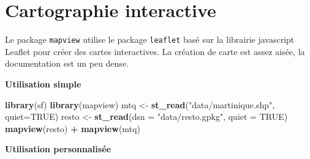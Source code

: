 \documentclass[]{book}
\newenvironment{Shaded}{\begin{snugshade}}{\end{snugshade}}
\newcommand{\KeywordTok}[1]{\textcolor[rgb]{0.13,0.29,0.53}{\textbf{#1}}}
\newcommand{\DataTypeTok}[1]{\textcolor[rgb]{0.13,0.29,0.53}{#1}}
\newcommand{\StringTok}[1]{\textcolor[rgb]{0.31,0.60,0.02}{#1}}
\newcommand{\OtherTok}[1]{\textcolor[rgb]{0.56,0.35,0.01}{#1}}
\newcommand{\OperatorTok}[1]{\textcolor[rgb]{0.81,0.36,0.00}{\textbf{#1}}}
\newcommand{\NormalTok}[1]{#1}
\begin{document}
\section{Cartographie interactive}\label{cartographie-interactive}

Le package \texttt{mapview} \citep{R-mapview} utilise le package
\texttt{leaflet} \citep{R-leaflet} basé sur la librairie javascript
Leaflet \citep{JS-Leaflet} pour créer des cartes interactives. La
création de carte est assez aisée, la documentation est un peu dense.

\textbf{Utilisation simple}

\begin{Shaded}
\begin{Highlighting}[]
\KeywordTok{library}\NormalTok{(sf)}
\KeywordTok{library}\NormalTok{(mapview)}
\NormalTok{mtq <-}\StringTok{ }\KeywordTok{st_read}\NormalTok{(}\StringTok{"data/martinique.shp"}\NormalTok{, }\DataTypeTok{quiet=}\OtherTok{TRUE}\NormalTok{)}
\NormalTok{resto <-}\StringTok{ }\KeywordTok{st_read}\NormalTok{(}\DataTypeTok{dsn =} \StringTok{"data/resto.gpkg"}\NormalTok{, }\DataTypeTok{quiet =} \OtherTok{TRUE}\NormalTok{)}
\KeywordTok{mapview}\NormalTok{(resto) }\OperatorTok{+}\StringTok{ }\KeywordTok{mapview}\NormalTok{(mtq) }
\end{Highlighting}
\end{Shaded}

\hypertarget{htmlwidget-675404505b74b330b279}{}

 \textbf{Utilisation personnalisée}
\end{document}
